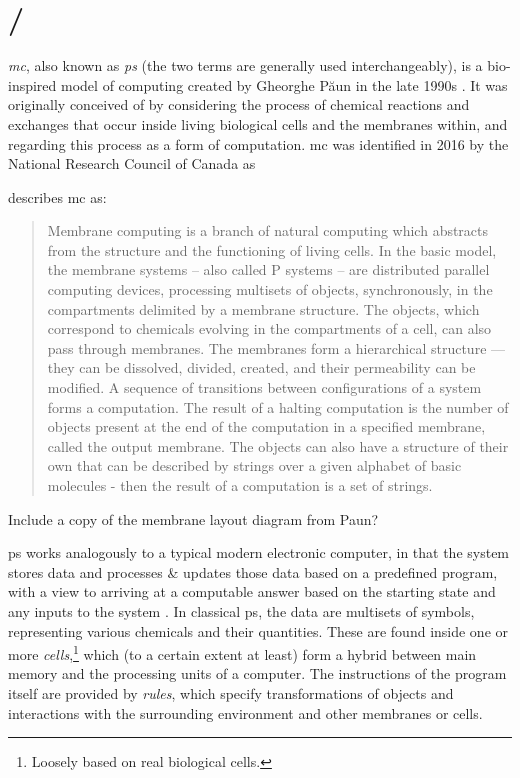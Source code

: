 \section{\label{sec:lr:mc}\texorpdfstring{}{Membrane computing}/}

\emph{\Gls{mc}}, also known as \emph{\gls{ps}} (the two terms are generally used interchangeably), is a bio-inspired model of computing created by Gheorghe Păun in the late 1990s \cite{tPaun98a,Paun2000}.  It was originally conceived of by considering the process of chemical reactions and exchanges that occur inside living biological cells and the membranes within, and regarding this process as a form of computation.  \Gls{mc} was identified in 2016 by the National Research Council of Canada as 

\citeauthor{Paun2002} describes \gls{mc} as:
\blockcquote[][p.~VII]{Paun2002}{Membrane computing is a branch of natural computing which abstracts from the structure and the functioning of living cells. In the basic model, the membrane systems -- also called P systems -- are distributed parallel computing devices, processing multisets of objects, synchronously, in the compartments delimited by a membrane structure. The objects, which correspond to chemicals evolving in the compartments of a cell, can also pass through membranes. The membranes form a hierarchical structure --- they can be dissolved, divided, created, and their permeability can be modified. A sequence of transitions between configurations of a system forms a computation. The result of a halting computation is the number of objects present at the end of the computation in a specified membrane, called the output membrane. The objects can also have a structure of their own that can be described by strings over a given alphabet of basic molecules - then the result of a computation is a set of strings.}

\begin{anfxerror}
Include a copy of the membrane layout diagram from Paun?
\end{anfxerror}

\Gls{ps} works analogously to a typical modern electronic computer, in that the system stores data and processes \& updates those data based on a predefined program, with a view to arriving at a computable answer based on the starting state and any inputs to the system \cite{Paun2002,Paun2010b}.  In classical \gls{ps}, the data are multisets of symbols, representing various chemicals and their quantities.  These are found inside one or more \emph{cells},\footnote{Loosely based on real biological cells.} which (to a certain extent at least) form a hybrid between main memory and the processing units of a computer.  The instructions of the program itself are provided by \emph{rules}, which specify transformations of objects and interactions with the surrounding environment and other membranes or cells.

